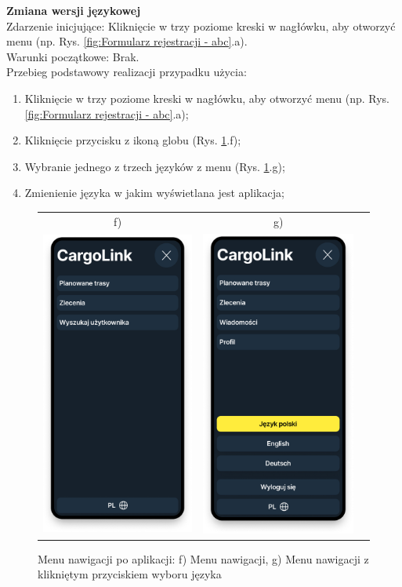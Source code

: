 \textbf{Zmiana wersji językowej} \\
Zdarzenie inicjujące: Kliknięcie w trzy poziome kreski w nagłówku, aby otworzyć menu (np. Rys. \ref{fig:Formularz rejestracji - abc}.a). \\
Warunki początkowe: Brak. \\
Przebieg podstawowy realizacji przypadku użycia:
\begin{enumerate}
    \item Kliknięcie w trzy poziome kreski w nagłówku, aby otworzyć menu (np. Rys. \ref{fig:Formularz rejestracji - abc}.a);
    \item Kliknięcie przycisku z ikoną globu (Rys. \ref{Rys. fig:Menu nawigacji po aplikacji - fg}.f);
    \item Wybranie jednego z trzech języków z menu (Rys. \ref{Rys. fig:Menu nawigacji po aplikacji - fg}.g);
    \item Zmienienie języka w jakim wyświetlana jest aplikacja;
\end{enumerate}
\begin{figure}[H]
	\centering
        \begin{tabular}{@{}ccc@{}}
            f) & g)\\
		\includegraphics[width=0.3\linewidth]{rozdzial1/menu.png} &
		\includegraphics[width=0.3\linewidth]{rozdzial1/menu_język.png}
		\end{tabular}
	\caption{Menu nawigacji po aplikacji: f) Menu nawigacji, g) Menu nawigacji z klikniętym przyciskiem wyboru języka}
	\label{Rys. fig:Menu nawigacji po aplikacji - fg}
\end{figure}

